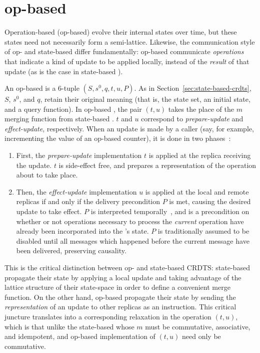 \section{op-based \CRDTs}
\label{sec:op-based-crdts}

Operation-based (op-based) \CRDTs evolve their internal states over time, but
these states need not necessarily form a semi-lattice.  Likewise, the
communication style of op- and state-based \CRDTs differ fundamentally: op-based
\CRDTs communicate \textit{operations} that indicate a kind of update to be
applied locally, instead of the \textit{result} of that update (as is the case
in state-based \CRDTs).

An op-based \CRDT is a $6$-tuple $(S, s^0, q, t, u, P)$. As in
Section~\ref{sec:state-based-crdts}, $S$, $s^0$, and $q$, retain their
original meaning (that is, the state set, an initial state, and a query
function).  In op-based \CRDTs, the pair $(t,u)$ takes the place of the $m$
merging function from state-based \CRDTs. $t$ and $u$ correspond to
\textit{prepare-update} and \textit{effect-update}, respectively. When an update
is made by a caller (say, for example, incrementing the value of an op-based
\CRDT counter), it is done in two phases~\citep{shapiro11}:
\begin{enumerate}
  \item First, the \textit{prepare-update} implementation $t$ is applied at the
    replica receiving the update. $t$ is side-effect free, and prepares a
    representation of the operation about to take place.
  \item Then, the \textit{effect-update} implementation $u$ is applied at the
    local and remote replicas if and only if the delivery precondition $P$ is
    met, causing the desired update to take effect. $P$ is interpreted
    temporally~\citep{shapiro11}, and is a precondition on whether or not
    operations necessary to process the \emph{current} operation have already
    been incorporated into the \CRDT's state. $P$ is traditionally assumed to be
    disabled until all messages which happened before the current message have
    been delivered, preserving causality.
\end{enumerate}

This is the critical distinction between op- and state-based CRDTS:
state-based \CRDTs propagate their state by applying a local update and taking
advantage of the lattice structure of their state-space in order to define a
convenient merge function. On the other hand, op-based \CRDTs propagate their
state by sending the \textit{representation} of an update to other replicas as
an instruction. This critical juncture translates into a corresponding
relaxation in the operation $(t, u)$, which is that unlike the state-based \CRDTs
whose $m$ must be commutative, associative, and idempotent, and op-based \CRDT
implementation of $(t, u)$ need only be commutative.

